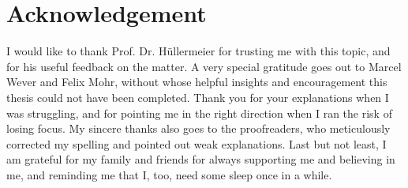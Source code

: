 \chapter*{Acknowledgement}
\label{sec:acknowledgement}
\vspace*{-10mm}

I would like to thank Prof. Dr. Hüllermeier for trusting me with this topic, and for his useful feedback on the matter. A very special gratitude goes out to Marcel Wever and Felix Mohr, without whose helpful insights and encouragement this thesis could not have been completed. Thank you for your explanations when I was struggling, and for pointing me in the right direction when I ran the risk of losing focus. My sincere thanks also goes to the proofreaders, who meticulously corrected my spelling and pointed out weak explanations. Last but not least, I am grateful for my family and friends for always supporting me and believing in me, and reminding me that I, too, need some sleep once in a while. 